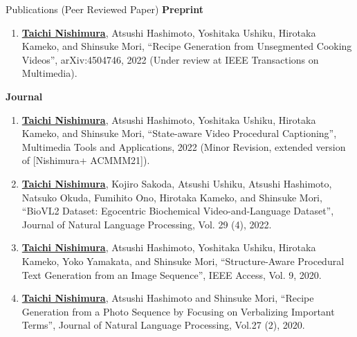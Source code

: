 \begin{rSection}{Publications (Peer Reviewed Paper)}
{\bf Preprint}
\vspace{-0.15cm}
\begin{enumerate}
    \item \underline{{\bf Taichi Nishimura}}, Atsushi Hashimoto, Yoshitaka Ushiku, Hirotaka Kameko, and Shinsuke Mori, ``Recipe Generation from Unsegmented Cooking Videos'', arXiv:4504746, 2022 (Under review at IEEE Transactions on Multimedia).
\end{enumerate}

{\bf Journal}
\vspace{-0.15cm}
\begin{enumerate}
    \item \underline{{\bf Taichi Nishimura}}, Atsushi Hashimoto, Yoshitaka Ushiku, Hirotaka Kameko, and Shinsuke Mori, ``State-aware Video Procedural Captioning'', Multimedia Tools and Applications, 2022 (Minor Revision, extended version of [Nishimura+ ACMMM21]).
    \item \underline{{\bf Taichi Nishimura}}, Kojiro Sakoda, Atsushi Ushiku, Atsushi Hashimoto, Natsuko Okuda, Fumihito Ono, Hirotaka Kameko, and Shinsuke Mori, ``BioVL2 Dataset: Egocentric Biochemical Video-and-Language Dataset'', Journal of Natural Language Processing, Vol. 29 (4), 2022.
    \item \underline{{\bf Taichi Nishimura}}, Atsushi Hashimoto, Yoshitaka Ushiku, Hirotaka Kameko, Yoko Yamakata, and Shinsuke Mori, ``Structure-Aware Procedural Text Generation from an Image Sequence'', IEEE Access, Vol. 9, 2020.
    \item \underline{{\bf Taichi Nishimura}}, Atsushi Hashimoto and Shinsuke Mori, ``Recipe Generation from a Photo Sequence by Focusing on Verbalizing Important Terms'', Journal of Natural Language Processing, Vol.27 (2), 2020.
\end{enumerate}


\end{rSection}
